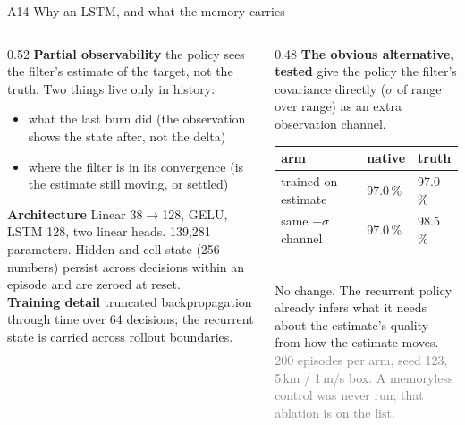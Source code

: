 \documentclass[aspectratio=169,11pt]{beamer}
\begin{document}
\begin{frame}{A14 \; Why an LSTM, and what the memory carries}
\begin{columns}[T]
\begin{column}{0.52\textwidth}\small
\textbf{Partial observability} \; the policy sees the filter's estimate of the target, not the truth. Two things live only in history:
\begin{itemize}
  \item what the last burn did (the observation shows the state after, not the delta)
  \item where the filter is in its convergence (is the estimate still moving, or settled)
\end{itemize}
\vspace{1mm}
\textbf{Architecture} \; Linear 38$\to$128, GELU, LSTM 128, two linear heads. 139,281 parameters. Hidden and cell state (256 numbers) persist across decisions within an episode and are zeroed at reset.\\[1.5mm]
\textbf{Training detail} \; truncated backpropagation through time over 64 decisions; the recurrent state is carried across rollout boundaries.
\end{column}
\begin{column}{0.48\textwidth}\small
\textbf{The obvious alternative, tested} \; give the policy the filter's covariance directly ($\sigma$ of range over range) as an extra observation channel.\\[1mm]
\begin{tabular}{@{}lll@{}}
\toprule
arm & native & truth\\
\midrule
trained on estimate & 97.0\,\% & 97.0\,\%\\
same $+\sigma$ channel & 97.0\,\% & 98.5\,\%\\
\bottomrule
\end{tabular}
\\[1.5mm]
No change. The recurrent policy already infers what it needs about the estimate's quality from how the estimate moves.\\[1.5mm]
{\scriptsize\textcolor{grey}{200 episodes per arm, seed 123, 5\,km / 1\,m/s box. A memoryless control was never run; that ablation is on the list.}}
\end{column}
\end{columns}
\end{frame}
\end{document}
